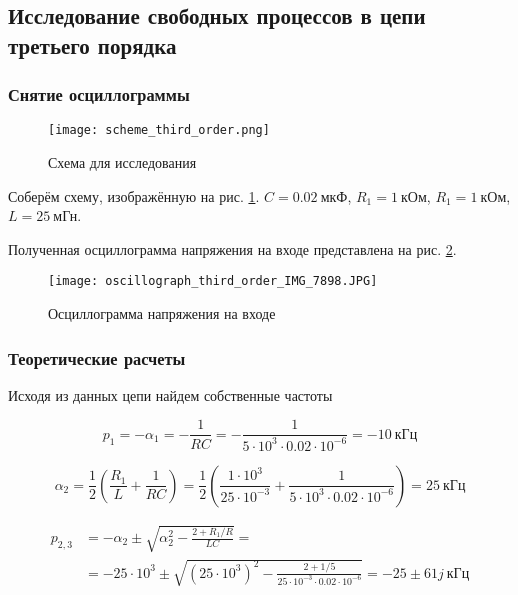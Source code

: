 \subsection{Исследование свободных процессов в цепи третьего порядка}

\subsubsection{Снятие осциллограммы}

\begin{figure}[!h]
    \centering
    \texttt{[image: scheme\_third\_order.png]}
    \caption{Схема для исследования}
    \label{fig:scheme_third_order}
\end{figure}

Соберём схему, изображённую на рис. \ref*{fig:scheme_third_order}.
$C = 0.02\ \text{мкФ}$, $R_1 = 1\ \text{кОм}$, $R_1 = 1\ \text{кОм}$,
$L = 25\ \text{мГн}$.

Полученная осциллограмма напряжения на входе представлена на
рис. \ref*{fig:oscillograph_third_order}.

\begin{figure}[!h]
    \centering
    \texttt{[image: oscillograph\_third\_order\_IMG\_7898.JPG]}
    \caption{Осциллограмма напряжения на входе}
    \label{fig:oscillograph_third_order}
\end{figure}

\subsubsection{Теоретические расчеты}

Исходя из данных цепи найдем собственные частоты

\[
    p_{1} = -\alpha_1 =
    -\frac{1}{R C}
    = -\frac{1}{5\cdot 10^{3} \cdot 0.02 \cdot 10^{-6}}
    = -10\ \text{кГц}
\]

\[
    \alpha_2
    = \frac{1}{2} \left( \frac{R_1}{L} + \frac{1}{R C} \right)
    = \frac{1}{2} \left(
    \frac{1 \cdot 10^{3} }{25 \cdot 10^{-3}}
    + \frac{1}{5 \cdot 10^{3} \cdot 0.02 \cdot 10^{-6}}
    \right)
    = 25\ \text{кГц}
\]

\[
    \begin{aligned}
        p_{2,3} & = -\alpha_2 \pm \sqrt{\alpha_2^2 - \frac{2+R_1/R}{L C}} = \\
                & = -25 \cdot 10^3 \pm \sqrt{
            (25 \cdot 10^3)^2 - \frac{2+1/5}{25 \cdot 10^{-3} \cdot 0.02 \cdot 10^{-6}}
        }
        = -25  \pm 61j\ \text{кГц}
    \end{aligned}
\]


